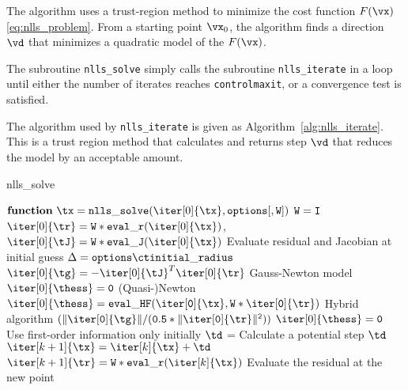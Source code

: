 
The algorithm uses a trust-region method to minimize the cost function
$F(\vx)$ \ref{eq:nlls_problem}.  From a starting point $\vx_0$, the algorithm finds a direction $\vd$ that minimizes a quadratic model of the $F(\vx)$.

The subroutine \texttt{nlls\_solve} simply calls the subroutine 
\texttt{nlls\_iterate} in a loop until either the number of iterates reaches 
\texttt{control\ct maxit}, or a convergence test is satisfied.

The algorithm used by \texttt{nlls\_iterate} is given as Algorithm~\ref{alg:nlls_iterate}.
This is a trust region method that calculates and returns step $\vd$ that 
reduces the model by an acceptable amount.  

\begin{algorithm}
\caption{nlls\_solve}
\label{alg:nlls_solve}
  \begin{algorithmic}[1]
    \State $ {\tt {\bf function} \  \tx = nlls\_solve}(\iter[0]{\tx},{\tt options[,W]})$
    \State ${\tt W=I}$
    \EndIf
    \State $\iter[0]{\tr} =  {\tt W * eval\_r}(\iter[0]{\tx})$, $\iter[0]{\tJ} = {\tt W * eval\_J}(\iter[0]{\tx})$    
    \Comment Evaluate residual and Jacobian at initial guess
    \State $\Delta = {\tt options\ct initial\_radius}$
    \State $ \iter[0]{\tg} = - {\iter[0]{\tJ}}^T\iter[0]{\tr}$
    \Comment Gauss-Newton model 
    \State $\iter[0]{\thess} = {\tt 0}$
    \Comment (Quasi-)Newton 
    \State $\iter[0]{\thess} = {\tt eval\_HF(\iter[0]{\tx},W * \iter[0]{\tr})}$
    \Comment Hybrid algorithm
    ${\tt (\| \iter[0]{\tg} \| / (0.5 * \|\iter[0]{\tr}\|^2) )}$
    \State $\iter[0]{\thess} = {\tt 0}$
    \Comment Use first-order information only initially
    \EndIf
        \State ${\td}$ = 
        \Comment Calculate a potential step $\td$
        \State $\iter[k+1]{\tx} = \iter[k]{\tx} + \td$
        \State $\iter[k+1]{\tr} = {\tt W * eval\_r}(\iter[k]{\tx})$
        \Comment Evaluate the residual at the new point

\end{algorithmic}
\end{algorithm}

